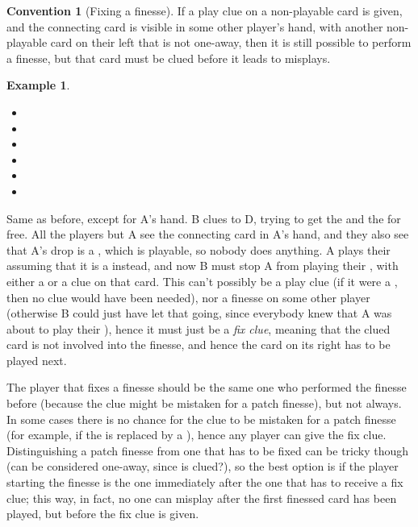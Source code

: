 \documentclass[a4paper]{article}
\theoremstyle{plain}
\theoremstyle{definition}
\newtheorem{example}[theorem]{Example}
\newtheorem{convention}[theorem]{Convention}
\begin{document}
\begin{convention}[Fixing a finesse]
	\label{unfinessing}
	If a play clue on a non-playable card is given, and the connecting card is visible in some other player's hand, with another non-playable card on their left that is not one-away, then it is still possible to perform a finesse, but that card must be clued before it leads to misplays.
\end{convention}

\begin{example}	\hfill \\
	\begin{minipage}{0.45\textwidth}
		\begin{itemize}
			\item[\Large +]      
			\item[\Large A]    
			\item[\Large B]    
			\item[\Large C]     
			\item[\Large D]    
			\item[\Large E]    
		\end{itemize}
	\end{minipage}%
	\begin{minipage}{0.55\textwidth}
		Same as before, except for A's hand. B clues  to D, trying to get the  and the  for free. All the players but A see the connecting card in A's hand, and they also see that A's drop is a , which is playable, so nobody does anything. A plays their  assuming that it is a  instead, and now B must stop A from playing their , with either a  or a  clue on that card. This can't possibly be a play clue (if it were a , then no clue would have been needed), nor a finesse on some other player (otherwise B could just have let that going, since everybody knew that A was about to play their ), hence it must just be a \emph{fix clue}, meaning that the clued card is not involved into the finesse, and hence the card on its right has to be played next.
	\end{minipage}
\end{example} \vspace{0.15 cm}

The player that fixes a finesse should be the same one who performed the finesse before (because the clue might be mistaken for a patch finesse), but not always. In some cases there is no chance for the clue to be mistaken for a patch finesse (for example, if the  is replaced by a ), hence any player can give the fix clue. Distinguishing a patch finesse from one that has to be fixed can be tricky though (can  be considered one-away, since  is clued?), so the best option is if the player starting the finesse is the one immediately after the one that has to receive a fix clue; this way, in fact, no one can misplay after the first finessed card has been played, but before the fix clue is given.
\end{document}
